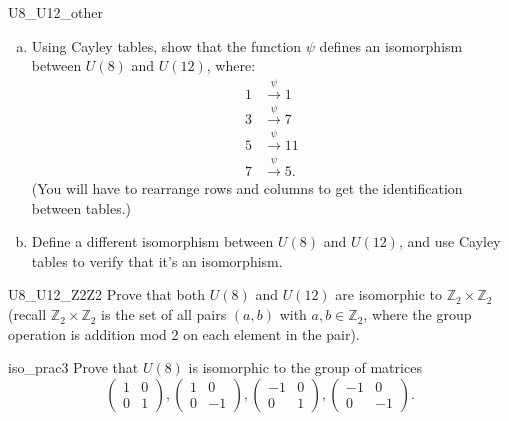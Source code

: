 \begin{exercise}{U8_U12_other}
\begin{enumerate}[(a)]
\item
Using Cayley tables, show that the function $\psi$ defines an isomorphism  between $U(8)$ and $U(12)$, where:
\begin{align*}
1 & \xrightarrow{\psi}  1 \\
3 & \xrightarrow{\psi}  7 \\
5 & \xrightarrow{\psi}  11 \\
7 & \xrightarrow{\psi}  5.
\end{align*}
(You will have to rearrange rows and columns to get the identification between tables.)
\item
Define a different isomorphism between $U(8)$ and $U(12)$, and use Cayley tables to verify that it's an isomorphism. 
\end{enumerate}
\end{exercise}

\begin{exercise}{U8_U12_Z2Z2}
Prove that both $U(8)$ and $U(12)$ are isomorphic to ${\mathbb Z}_2 \times {\mathbb Z}_2$ (recall $\mathbb{Z}_2 \times \mathbb{Z}_2$ is the set of all pairs $(a,b)$ with $a,b \in \mathbb{Z}_2$, where 
the group operation is addition mod 2 on each element in the pair). 
\end{exercise}

 \begin{exercise}{iso_prac3}
Prove that $U(8)$ is isomorphic to the group of matrices
\[
\begin{pmatrix}
1 & 0 \\
0 & 1
\end{pmatrix},
\begin{pmatrix}
1 & 0 \\
0 & -1
\end{pmatrix},
\begin{pmatrix}
-1 & 0 \\
0 & 1
\end{pmatrix},
\begin{pmatrix}
-1 & 0 \\
0 & -1
\end{pmatrix}.
\]
\end{exercise} 

